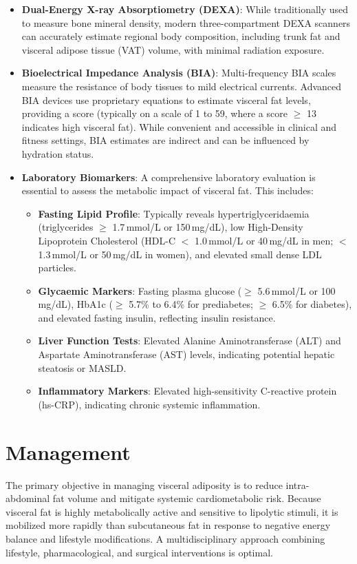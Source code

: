 \begin{itemize}
    \item \textbf{Dual-Energy X-ray Absorptiometry (DEXA)}: While traditionally used to measure bone mineral density, modern three-compartment DEXA scanners can accurately estimate regional body composition, including trunk fat and visceral adipose tissue (VAT) volume, with minimal radiation exposure.
    \item \textbf{Bioelectrical Impedance Analysis (BIA)}: Multi-frequency BIA scales measure the resistance of body tissues to mild electrical currents. Advanced BIA devices use proprietary equations to estimate visceral fat levels, providing a score (typically on a scale of 1 to 59, where a score $\ge$ 13 indicates high visceral fat). While convenient and accessible in clinical and fitness settings, BIA estimates are indirect and can be influenced by hydration status.
    \item \textbf{Laboratory Biomarkers}: A comprehensive laboratory evaluation is essential to assess the metabolic impact of visceral fat. This includes:
    \begin{itemize}
        \item \textbf{Fasting Lipid Profile}: Typically reveals hypertriglyceridaemia (triglycerides $\ge$ 1.7\,mmol/L or 150\,mg/dL), low High-Density Lipoprotein Cholesterol (HDL-C $<$ 1.0\,mmol/L or 40\,mg/dL in men; $<$ 1.3\,mmol/L or 50\,mg/dL in women), and elevated small dense LDL particles.
        \item \textbf{Glycaemic Markers}: Fasting plasma glucose ($\ge$ 5.6\,mmol/L or 100\,mg/dL), HbA1c ($\ge$ 5.7\% to 6.4\% for prediabetes; $\ge$ 6.5\% for diabetes), and elevated fasting insulin, reflecting insulin resistance.
        \item \textbf{Liver Function Tests}: Elevated Alanine Aminotransferase (ALT) and Aspartate Aminotransferase (AST) levels, indicating potential hepatic steatosis or MASLD.
        \item \textbf{Inflammatory Markers}: Elevated high-sensitivity C-reactive protein (hs-CRP), indicating chronic systemic inflammation.
    \end{itemize}
\end{itemize}

\section*{Management}
The primary objective in managing visceral adiposity is to reduce intra-abdominal fat volume and mitigate systemic cardiometabolic risk. Because visceral fat is highly metabolically active and sensitive to lipolytic stimuli, it is mobilized more rapidly than subcutaneous fat in response to negative energy balance and lifestyle modifications. A multidisciplinary approach combining lifestyle, pharmacological, and surgical interventions is optimal.

